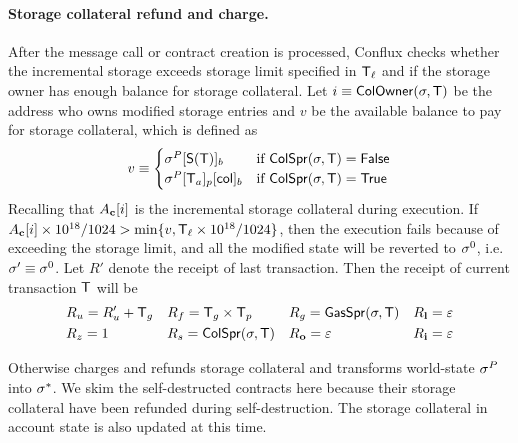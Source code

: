 \paragraph{Storage collateral refund and charge.}

After the message call or contract creation is processed, Conflux checks whether the incremental storage exceeds storage limit specified in $\textsf{T}_\ell$ and if the storage owner has enough balance for storage collateral. 
Let $i\equiv \mathsf{ColOwner}(\mathbf{\sigma},\textsf{T})$ be the address who owns modified storage entries and $v$ be the available balance to pay for storage collateral, which is defined as 
\begin{align}
	v \equiv \begin{cases}
		\mathbf{\sigma}^{P}[\mathsf{S}{\left({\textsf{T}} \right)}]_b & \text{if }\mathsf{ColSpr}(\mathbf{\sigma},\textsf{T})=\mathsf{False} \\
		\mathbf{\sigma}^{P}[\textsf{T}_a]_p[{\sf col}]_b &  \text{if }\mathsf{ColSpr}(\mathbf{\sigma},\textsf{T})=\mathsf{True}
	\end{cases}
\end{align}
%
Recalling that $A_{\bf c}[i]$ is the incremental storage collateral during execution.
If $A_{\bf c}[i]\times 10^{18}/1024>\min\{v,\textsf{T}_\ell\times 10^{18}/1024\}$, then the execution fails because of exceeding the storage limit, 
and all the modified state will be reverted to $\mathbf{\sigma}^0$, 
i.e. $\mathbf{\sigma}'\equiv\mathbf{\sigma}^0$. 
Let $R'$ denote the receipt of last transaction.
Then the receipt of current transaction $\textsf{T}$ will be 
\begin{align}
	&R_u=R'_u+\textsf{T}_g && R_f = \textsf{T}_g\times\textsf{T}_p && R_g = \mathsf{GasSpr}(\mathbf{\sigma},\textsf{T}) && R_{\bf l}=\mathbb{\varepsilon} \\
	&R_z=1 && R_s = \mathsf{ColSpr}(\mathbf{\sigma},\textsf{T}) && R_{\bf o}=\mathbb{\varepsilon} && R_{\bf i}=\mathbb{\varepsilon}
\end{align}

Otherwise \name charges and refunds storage collateral and transforms world-state $\mathbf{\sigma}^P$ into $\mathbf{\sigma}^*$. 
We skim the self-destructed contracts here because their storage collateral have been refunded during self-destruction. 
The storage collateral in account state is also updated at this time. 

